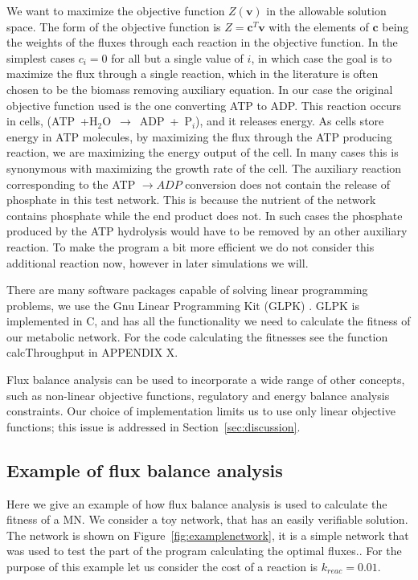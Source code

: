 \documentclass[a4paper,12pt]{article}
\begin{document}
	We want to maximize the objective function $Z \left( \mathbf{v} \right)$ in the allowable solution space.   The form of the objective function is $Z=\mathbf{c}^T \mathbf{v}$ with the elements of $\mathbf{c}$ being the weights of the fluxes through each reaction in the objective function. In the simplest cases $c_i=0$ for all but a single value of $i$, in which case the goal is to maximize the flux through a single reaction, which in the literature is often chosen to be the biomass removing auxiliary equation\cite{whatisfluxbalance}. In our case the original objective function used is the one converting ATP to ADP. This reaction occurs in cells, (ATP~+H$_2$O~$\rightarrow$~ADP~+~P$_i$), and it releases energy. As cells store energy in ATP molecules,  by maximizing the flux through the ATP producing reaction, we are maximizing the energy output of the cell. In many cases this is synonymous with maximizing the growth rate of the cell. The auxiliary reaction corresponding to the ATP $\rightarrow ADP$ conversion does not contain the release of phosphate in this test network. This is because the nutrient of the network contains phosphate while the end product does not. In such cases the phosphate produced by the ATP hydrolysis would have to be removed by an other auxiliary reaction. To make the program a bit more efficient we do not consider this additional reaction now, however in later simulations we will. 

	
	There are many software packages capable of solving linear programming problems, we use the Gnu Linear Programming Kit (GLPK) \cite{glpk}. GLPK is implemented in C, and has all the functionality we need to calculate the fitness of our metabolic network. For the code calculating the fitnesses see the function calcThroughput in APPENDIX X.

	Flux balance analysis can be used to incorporate a wide range of other concepts, such as non-linear objective functions, regulatory and energy balance analysis constraints\cite{fbaconstraints}. Our choice of implementation limits us to use only linear objective functions; this issue is addressed in Section~\ref{sec:discussion}.

\subsection*{Example of flux balance analysis}
\label{sub:example_of_flux_balance_analysis}

Here we give an example of how flux balance analysis is used to calculate the fitness of a MN. We consider a toy network, that has an easily verifiable solution. The network is shown on Figure~\ref{fig:examplenetwork}, it is a simple network that was used to test the part of the program calculating the optimal fluxes.. For the purpose of this example let us consider the cost of a reaction is $k_{reac}=0.01$.
\end{document}
